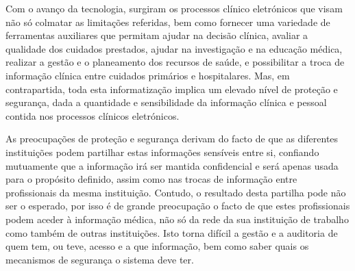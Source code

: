 \documentclass[conference]{IEEEtran}
\begin{document}
Com o avanço da tecnologia, surgiram os processos clínico eletrónicos que visam não só colmatar as limitações referidas, bem como fornecer uma variedade de ferramentas auxiliares que permitam ajudar na decisão clínica, avaliar a qualidade dos cuidados prestados, ajudar na investigação e na educação médica, realizar a gestão e o planeamento dos recursos de saúde, e possibilitar a troca de informação clínica entre cuidados primários e hospitalares. Mas, em contrapartida, toda esta informatização implica um elevado nível de proteção e segurança, dada a quantidade e sensibilidade da informação clínica e pessoal contida nos processos clínicos eletrónicos.

As preocupações de proteção e segurança derivam do facto de que as diferentes instituições podem partilhar estas informações sensíveis entre si, confiando mutuamente que a informação irá ser mantida confidencial e será apenas usada para o propósito definido, assim como nas trocas de informação entre profissionais da mesma instituição. Contudo, o resultado desta partilha pode não ser o esperado, por isso é de grande preocupação o facto de que estes profissionais podem aceder à informação médica, não só da rede da sua instituição de trabalho como também de outras instituições. Isto torna difícil a gestão e a auditoria de quem tem, ou teve, acesso e a que informação, bem como saber quais os mecanismos de segurança o sistema deve ter.
\end{document}
